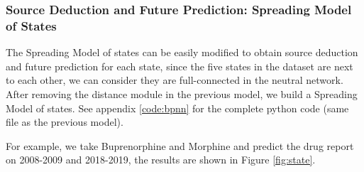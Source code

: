 \documentclass{mcmthesis}
\begin{document}
\subsubsection{Source Deduction and Future Prediction: Spreading Model of States}

The Spreading Model of states can be easily modified to obtain source deduction and future prediction for each state, since the five states in the dataset are next to each other, we can consider they are full-connected in the neutral network. After removing the distance module in the previous model, we build a Spreading Model of states. See appendix \ref{code:bpnn} for the complete python code (same file as the previous model). 

For example, we take Buprenorphine and Morphine and predict the drug report on 2008-2009 and 2018-2019, the results are shown in Figure \ref{fig:state}.
\end{document}
